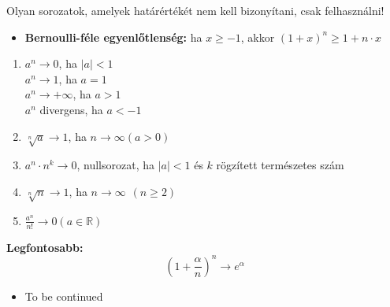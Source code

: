 \documentclass[12pt,a4paper]{article}
\begin{document}
\begin{tcolorbox}[colback=green!5!white,colframe=green!60!black,title= 3. Nevezetes sorozatok]
    Olyan sorozatok, amelyek határértékét nem kell bizonyítani, csak felhasználni!
    \begin{itemize}
        \item \textbf{Bernoulli-féle egyenlőtlenség:} ha \(x \geq  -1\), akkor \((1+x)^n \geq 1 + n\cdot x\)
    \end{itemize}
    \begin{enumerate}
        \item \(a^n \to 0\), ha \(\left\lvert a\right\rvert <1\)\\
        \(a^n \to 1\), ha \(a=1\)\\
        \(a^n \to +\infty\), ha \(a>1\)\\
        \(a^n\) divergens, ha \(a<-1\)
        \item \(\sqrt[n]{a} \to 1\), ha \(n \to \infty (a>0)\)
        \item \(a^n\cdot n^k \rightarrow 0\), nullsorozat, ha \(\left\lvert a\right\rvert <1 \) és \(k\) rögzített természetes szám
        \item \(\sqrt[n]{n} \to 1\), ha \(n \to \infty \hspace{5pt}(n\geq 2)\)
        \item \(\frac{a^n}{n!} \to 0 (a \in \mathbb{R} )\)
    \end{enumerate}
    \textbf{Legfontosabb:}
    $$(1+\frac{\alpha}{n})^n \to e^{\alpha}$$
\end{tcolorbox}

\begin{tcolorbox}[colback=green!5!white,colframe=green!60!black,title= 4. Cauchy sorozat]
    \begin{itemize}
        \item To be continued
    \end{itemize}
\end{tcolorbox}
\end{document}
